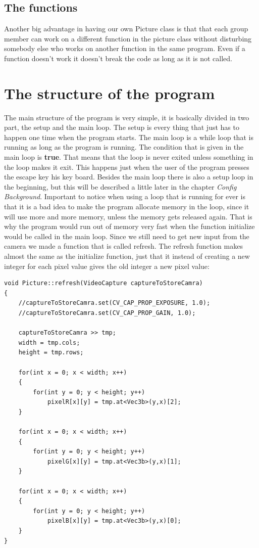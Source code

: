 \subsection{The functions}
Another big advantage in having our own Picture class is that that each group member can work on a different function in the picture class without disturbing somebody else who works on another function in the same program. Even if a function doesn't work it doesn't break the code as long as it is not called. 

\section{The structure of the program}

The main structure of the program is very simple, it is basically divided in two part, the setup and the main loop. The setup is every thing that just has to happen one time when the program starts. The main loop is a while loop that is running as long as the program is running. The condition that is given in the main loop is \textbf{true}. That means that the loop is never exited unless something in the loop makes it exit. This happens just when the user of the program presses the escape key his key board.
Besides the main loop there is also a setup loop in the beginning, but this will be described a little later in the chapter \textit{Config Background}. 
Important to notice when using a loop that is running for ever is that it is a bad idea to make the program allocate memory in the loop, since it will use more and more memory, unless the memory gets released again. That is why the program would run out of memory very fast when the function initialize would be called in the main loop. Since we still need to get new input from the camera we made a function that is called refresh. The refresh function makes almost the same as the initialize function, just that it instead of creating a new integer for each pixel value gives the old integer a new pixel value:

\begin{lstlisting}
void Picture::refresh(VideoCapture captureToStoreCamra)
{
	//captureToStoreCamra.set(CV_CAP_PROP_EXPOSURE, 1.0);
	//captureToStoreCamra.set(CV_CAP_PROP_GAIN, 1.0);

	captureToStoreCamra >> tmp;
	width = tmp.cols;
	height = tmp.rows;

	for(int x = 0; x < width; x++)
	{
		for(int y = 0; y < height; y++)
			pixelR[x][y] = tmp.at<Vec3b>(y,x)[2];
	}

	for(int x = 0; x < width; x++)
	{
		for(int y = 0; y < height; y++)
			pixelG[x][y] = tmp.at<Vec3b>(y,x)[1];
	}

	for(int x = 0; x < width; x++)
	{
		for(int y = 0; y < height; y++)
			pixelB[x][y] = tmp.at<Vec3b>(y,x)[0];
	}
}
\end{lstlisting}

